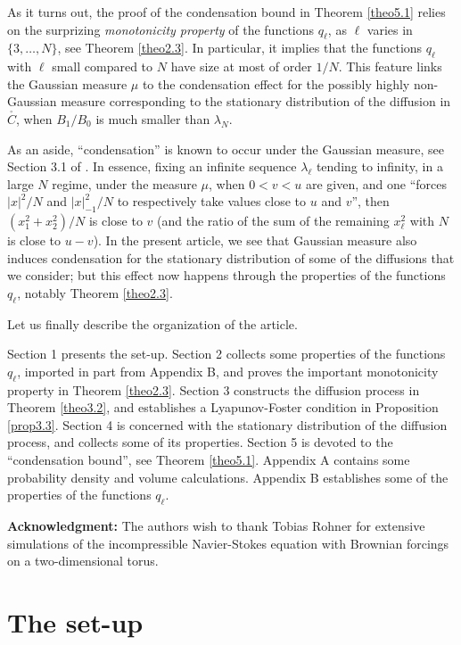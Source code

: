 \documentclass[12pt,leqno]{article}
\def\n{\noindent}
\begin{document}
\medskip
As it turns out, the proof of the condensation bound in Theorem \ref{theo5.1} relies on the surprizing \textit{monotonicity property} of the functions $q_\ell$, as $\ell$ varies in $\{3, \dots, N\}$, see Theorem \ref{theo2.3}. In particular, it implies that the functions $q_\ell$ with $\ell$ small compared to $N$ have size at most of order $1/N$. This feature links the Gaussian measure $\mu$ to the condensation effect for the possibly highly non-Gaussian measure corresponding to the stationary distribution of the diffusion in $\stackrel{_\circ}{C}$, when $B_1 / B_0$ is much smaller than $\lambda_N$.

\medskip
As an aside, ``condensation'' is known to occur under the Gaussian measure, see Section 3.1 of \cite{BoucCorv10}. In essence, fixing an infinite sequence $\lambda_\ell$ tending to infinity, in a large $N$ regime, under the measure $\mu$, when $0 < v < u$ are given, and one ``forces $|x|^2/N$ and $|x|^2_{-1}/N$ to respectively take values close to $u$ and $v$'', then $(x^2_1 + x^2_2)/N$ is close to $v$ (and the ratio of the sum of the remaining $x^2_\ell$ with $N$ is close to $u-v$). In the present article, we see that Gaussian measure also induces condensation for the stationary distribution of some of the diffusions that we consider; but this effect now happens through the properties of the functions $q_\ell$, notably Theorem \ref{theo2.3}.

\medskip
Let us finally describe the organization of the article. 

\medskip
Section 1 presents the set-up. Section 2 collects some properties of the functions $q_\ell$, imported in part from Appendix B, and proves the important monotonicity property in Theorem \ref{theo2.3}. Section 3 constructs the diffusion process in Theorem \ref{theo3.2}, and establishes a Lyapunov-Foster condition in Proposition \ref{prop3.3}. Section 4 is concerned with the stationary distribution of the diffusion process, and collects some of its properties. Section 5 is devoted to the ``condensation bound'', see Theorem \ref{theo5.1}. Appendix A contains some probability density and volume calculations. Appendix B establishes some of the properties of the functions $q_\ell$.

\bigskip\bigskip\n
{\bf Acknowledgment:} The authors wish to thank Tobias Rohner for extensive simulations of the incompressible Navier-Stokes equation with Brownian forcings on a two-dimensional torus.

\bigskip
\section{The set-up}
\setcounter{equation}{0}
\end{document}
